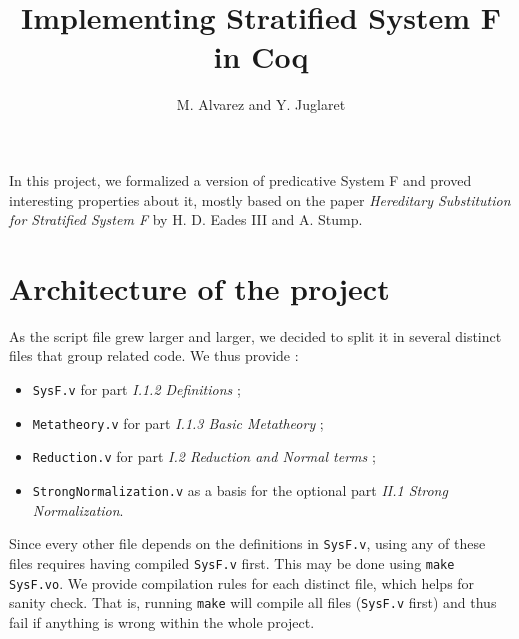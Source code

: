 \documentclass[a4paper,11pt]{article}
\begin{document}
\title{Implementing Stratified System F in Coq}
\author{M. Alvarez and Y. Juglaret}
\date{}
\maketitle

In this project, we formalized a version of predicative System F and
proved interesting properties about it, mostly based on the paper
\emph{Hereditary Substitution for Stratified System F} by H. D. Eades
III and A. Stump.

\section{Architecture of the project}

As the script file grew larger and larger, we decided to split it in
several distinct files that group related code. We thus provide :

\begin{itemize}
  \item \verb|SysF.v| for part \emph{I.1.2 Definitions} ;
  \item \verb|Metatheory.v| for part \emph{I.1.3 Basic Metatheory} ;
  \item \verb|Reduction.v| for part \emph{I.2 Reduction and Normal
    terms} ;
  \item \verb|StrongNormalization.v| as a basis for the optional
    part \emph{II.1 Strong Normalization}.
\end{itemize}

Since every other file depends on the definitions in \verb|SysF.v|,
using any of these files requires having compiled \verb|SysF.v|
first. This may be done using \verb|make SysF.vo|. We provide
compilation rules for each distinct file, which helps for sanity
check. That is, running \verb|make| will compile all files
(\verb|SysF.v| first) and thus fail if anything is wrong within the
whole project.
\end{document}
